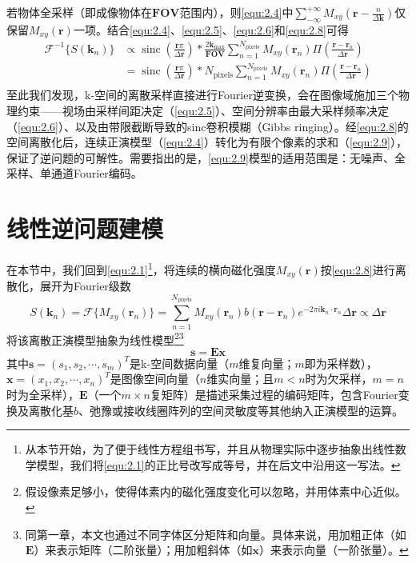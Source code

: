 \documentclass[12pt]{article}
\begin{document}
若物体全采样（即成像物体在$\mathbf{FOV}$范围内），则\autoref{equ:2.4}中$\sum_{-\infty}^{+\infty}M_{xy}\left(\bm{r}-\frac{n}{\Delta\bm{k}}\right)$仅保留$M_{xy}(\bm{r})$一项。结合\autoref{equ:2.4}、\autoref{equ:2.5}、\autoref{equ:2.6}和\autoref{equ:2.8}可得
\begin{equation}
    \begin{aligned}
        \mathcal{F}^{-1}\{S(\bm{k}_n)\}
        &\propto\operatorname{sinc}\left(\frac{\bm{r}\pi}{\Delta\bm{r}}\right)*\frac{2\bm{k}_{\max}}{\mathbf{FOV}}\sum_{n=1}^{N_{\mathrm{pixels}}} M_{xy}(\bm{r}_n)\Pi\left(\frac{\bm{r}-\bm{r}_n}{\Delta\bm{r}}\right) \\
        &=\boxed{\operatorname{sinc}\left(\frac{\bm{r}\pi}{\Delta\bm{r}}\right)*N_\mathrm{pixels}\sum_{n=1}^{N_{\mathrm{pixels}}} M_{xy}(\bm{r}_n)\Pi\left(\frac{\bm{r}-\bm{r}_n}{\Delta\bm{r}}\right)} \\
    \end{aligned}
    \label{equ:2.9}
\end{equation}
至此我们发现，k-空间的离散采样直接进行Fourier逆变换，会在图像域施加三个物理约束——视场由采样间距决定（\autoref{equ:2.5}）、空间分辨率由最大采样频率决定（\autoref{equ:2.6}）、以及由带限截断导致的sinc卷积模糊（Gibbs ringing）。经\autoref{equ:2.8}的空间离散化后，连续正演模型（\autoref{equ:2.4}）转化为有限个像素的求和（\autoref{equ:2.9}），保证了逆问题的可解性。需要指出的是，\autoref{equ:2.9}模型的适用范围是：无噪声、全采样、单通道Fourier编码。

\section{线性逆问题建模}
在本节中，我们回到\autoref{equ:2.1}\footnote{从本节开始，为了便于线性方程组书写，并且从物理实际中逐步抽象出线性数学模型，我们将\autoref{equ:2.1}的正比号改写成等号，并在后文中沿用这一写法。}，将连续的横向磁化强度$M_{xy}(\bm{r})$按\autoref{equ:2.8}进行离散化，展开为Fourier级数
\begin{equation}
    S(\bm{k}_n)=\mathcal{F}\{M_{xy}(\bm{r}_n)\}=\sum_{n=1}^{N_{\mathrm{pixels}}} M_{xy}(\bm{r}_n)b(\bm{r}-\bm{r}_n)e^{-2\pi i\bm{k}_n\cdot\bm{r}_n}\Delta\bm{r}\propto\Delta\bm{r}
    \label{equ:2.10}
\end{equation}
将该离散正演模型抽象为线性模型\footnote{假设像素足够小，使得体素内的磁化强度变化可以忽略，并用体素中心近似。}\footnote{同第一章，本文也通过不同字体区分矩阵和向量。具体来说，用加粗正体（如$\mathbf{E}$）来表示矩阵（二阶张量）；用加粗斜体（如$\bm{x}$）来表示向量（一阶张量）。}
\begin{equation}
    \boxed{\bm{s}=\mathbf{E}\bm{x}}
    \label{equ:2.11}
\end{equation}
其中$\bm{s}=(s_1,s_2,\cdots,s_m)^T$是k-空间数据向量（$m$维复向量；$m$即为采样数），$\bm{x}=(x_1,x_2,\cdots,x_n)^T$是图像空间向量（$n$维实向量；且$m<n$时为欠采样，$m=n$时为全采样），$\mathbf{E}$（一个$m\times n$复矩阵）是描述采集过程的编码矩阵，包含Fourier变换及离散化基$b$、弛豫或接收线圈阵列的空间灵敏度等其他纳入正演模型的运算。
\end{document}
